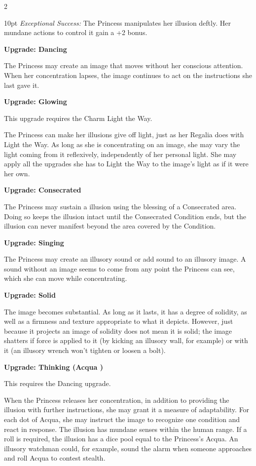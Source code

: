 \begin{multicols}{2}
\begin{myindentpar}{10pt}
\emph{Exceptional Success:} The Princess manipulates her illusion deftly. Her mundane actions to control it gain a +2 bonus.

\textbf{Upgrade: Dancing}

The Princess may create an image that moves without her conscious attention. When her concentration lapses, the image continues to act on the instructions she last gave it.

\textbf{Upgrade: Glowing}

This upgrade requires the Charm Light the Way.

The Princess can make her illusions give off light, just as her Regalia does with Light the Way. As long as she is concentrating on an image, she may vary the light coming from it reflexively, independently of her personal light. She may apply all the upgrades she has to Light the Way to the image’s light as if it were her own.

\textbf{Upgrade: Consecrated}

The Princess may sustain a illusion using the blessing of a Consecrated area. Doing so keeps the illusion intact until the Consecrated Condition ends, but the illusion can never manifest beyond the area covered by the Condition. 

\textbf{Upgrade: Singing}

The Princess may create an illusory sound or add sound to an illusory image. A sound without an image seems to come from any point the Princess can see, which she can move while concentrating.

\textbf{Upgrade: Solid}

The image becomes substantial. As long as it lasts, it has a degree of solidity, as well as a firmness and texture appropriate to what it depicts. However, just because it projects an image of solidity does not mean it is solid; the image shatters if force is applied to it (by kicking an illusory wall, for example) or with it (an illusory wrench won't tighten or loosen a bolt).

\textbf{Upgrade: Thinking (Acqua \textbullet\textbullet)}

This requires the Dancing upgrade. 

When the Princess releases her concentration, in addition to providing the illusion with further instructions, she may grant it a measure of adaptability. For each dot of Acqua, she may instruct the image to recognize one condition and react in response. The illusion has mundane senses within the human range. If a roll is required, the illusion has a dice pool equal to the Princess's Acqua. An illusory watchman could, for example, sound the alarm when someone approaches and roll Acqua to contest stealth.


\end{myindentpar}
\end{multicols}

